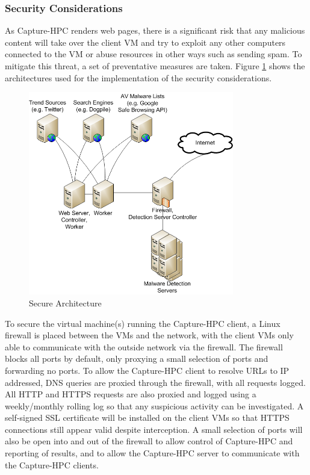 \subsubsection{Security Considerations}

As Capture-HPC renders web pages, there is a significant risk that any malicious
content will take over the client VM and try to exploit any other computers
connected to the VM or abuse resources in other ways such as sending spam.
To mitigate this threat, a set of preventative measures are taken. 
Figure \ref{fig:sec-1} shows the architectures used for the implementation of the security
considerations.

\begin{figure}[htb]
\centering
\includegraphics[width=0.8\textwidth]{img/physical-arch-pres.png}
\caption{Secure Architecture}
\label{fig:sec-1}
\end{figure}

To secure the virtual machine(s) running the Capture-HPC client, a Linux
firewall is placed between the VMs and the network, with the client VMs only
able to communicate with the outside network via the firewall. The firewall
blocks all ports by default, only proxying a small selection of ports and
forwarding no ports. To allow the Capture-HPC client to resolve URLs to IP
addressed, DNS
queries are proxied through the firewall, with all requests logged. All HTTP and
HTTPS requests are also proxied and logged using a weekly/monthly rolling log
so that any suspicious
activity can be investigated. A self-signed SSL certificate will be installed on
the client VMs so that HTTPS connections still appear valid despite interception.
A small selection of ports will also be open into and out of the firewall to
allow control of Capture-HPC and reporting of results, and to allow the
Capture-HPC server to communicate with the Capture-HPC clients.

